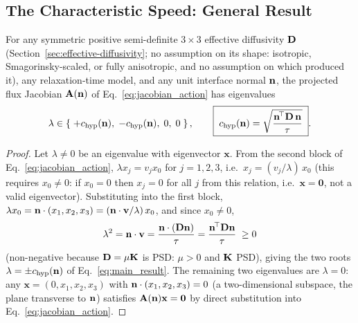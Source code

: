 \subsection{The Characteristic Speed: General Result}
\label{sec:main-theorem}

\begin{proposition}
\label{prop:main}
For any symmetric positive semi-definite $3\times3$ effective diffusivity
$\mathbf{D}$ (Section~\ref{sec:effective-diffusivity}; no assumption on its
shape: isotropic, Smagorinsky-scaled, or fully anisotropic, and no
assumption on which  produced it), any
relaxation-time model, and any unit interface normal $\mathbf{n}$, the
projected flux Jacobian $\mathbf A(\mathbf{n})$ of Eq.~\eqref{eq:jacobian_action}
has eigenvalues
\begin{equation}
  \label{eq:main_result}
  \lambda \in \left\{ \; +c_{\rm hyp}(\mathbf{n}),\; -c_{\rm hyp}(\mathbf{n}),\; 0,\; 0 \; \right\} ,
  \qquad
  \boxed{\;c_{\rm hyp}(\mathbf{n}) = \sqrt{\dfrac{\mathbf{n}^{\!\top}\mathbf{D}\,\mathbf{n}}{\tau}}\;} .
\end{equation}
\end{proposition}

\begin{proof}
Let $\lambda\neq0$ be an eigenvalue with eigenvector $\mathbf x$. From the
second block of Eq.~\eqref{eq:jacobian_action}, $\lambda x_j = v_j x_0$ for
$j=1,2,3$, i.e.\ $x_j = (v_j/\lambda)\,x_0$ (this requires $x_0\neq0$: if
$x_0=0$ then $x_j=0$ for all $j$ from this relation, i.e.\ $\mathbf
x=\mathbf 0$, not a valid eigenvector). Substituting into the first block,
$\lambda x_0 = \mathbf{n}\cdot(x_1,x_2,x_3) = (\mathbf{n}\cdot\mathbf v/\lambda)\,x_0$,
and since $x_0\neq0$,
\begin{equation}
  \lambda^2 = \mathbf{n}\cdot\mathbf v = \frac{\mathbf{n}\cdot(\mathbf{D}\mathbf{n})}{\tau} = \frac{\mathbf{n}^{\!\top}\mathbf{D}\mathbf{n}}{\tau} \; \geq 0
\end{equation}
(non-negative because $\mathbf{D}=\mu\mathbf{K}$ is PSD: $\mu>0$ and $\mathbf{K}$ PSD),
giving the two roots
$\lambda=\pm c_{\rm hyp}(\mathbf{n})$ of Eq.~\eqref{eq:main_result}. The remaining two
eigenvalues are $\lambda=0$: any $\mathbf x=(0,x_1,x_2,x_3)$ with
$\mathbf{n}\cdot(x_1,x_2,x_3)=0$ (a two-dimensional subspace, the plane
transverse to $\mathbf{n}$) satisfies $\mathbf A(\mathbf{n})\mathbf x=\mathbf 0$
by direct substitution into Eq.~\eqref{eq:jacobian_action}.
\end{proof}

